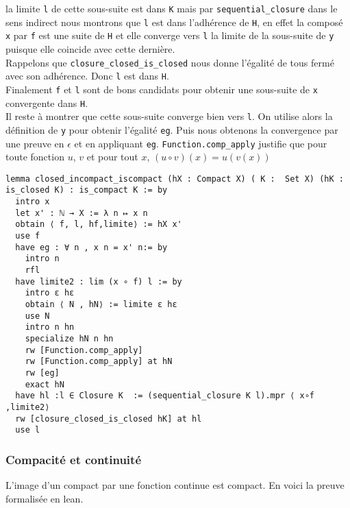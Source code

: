 \documentclass[a4paper, 12pt]{article}
\newcommand{\lean}[1]{\texttt{#1}}
\begin{document}
la limite \lean{l} de cette sous-suite est dans \lean{K} mais par \lean{sequential_closure} dans le sens indirect nous montrons que \lean{l} est dans l'adhérence de \lean{H}, en effet la composé \lean{x} par \lean{f} est une suite de \lean{H} et elle converge vers \lean{l} la limite de la sous-suite de \lean{y} puisque elle coincide avec cette dernière.\\

Rappelons que \lean{closure_closed_is_closed} nous donne l'égalité de tous fermé avec son adhérence. Donc \lean{l} est dans \lean{H}.\\

Finalement \lean{f} et \lean{l} sont de bons candidats pour obtenir une sous-suite de \lean{x} convergente dans \lean{H}.\\

Il reste à montrer que cette sous-suite converge bien vers \lean{l}. On utilise alors la définition de \lean{y} pour obtenir l'égalité \lean{eg}. Puis nous obtenons la convergence par une preuve en $\epsilon$ et en appliquant \lean{eg}. \lean{Function.comp_apply} justifie que pour toute fonction $u$, $v$ et pour tout $x$, $(u \circ v) (x) = u(v(x)) $ 




\begin{verbatim}
lemma closed_incompact_iscompact (hX : Compact X) ( K :  Set X) (hK : is_closed K) : is_compact K := by
  intro x
  let x' : ℕ → X := λ n ↦ x n
  obtain ⟨ f, l, hf,limite⟩ := hX x'
  use f 
  have eg : ∀ n , x n = x' n:= by
    intro n
    rfl
  have limite2 : lim (x ∘ f) l := by
    intro ε hε 
    obtain ⟨ N , hN⟩ := limite ε hε 
    use N 
    intro n hn
    specialize hN n hn
    rw [Function.comp_apply]
    rw [Function.comp_apply] at hN
    rw [eg]
    exact hN
  have hl :l ∈ Closure K  := (sequential_closure K l).mpr ⟨ x∘f ,limite2⟩ 
  rw [closure_closed_is_closed hK] at hl
  use l
\end{verbatim}



\subsubsection{Compacité et continuité}
L'image d'un compact par une fonction continue est compact. En voici la preuve formalisée en lean.
\end{document}

